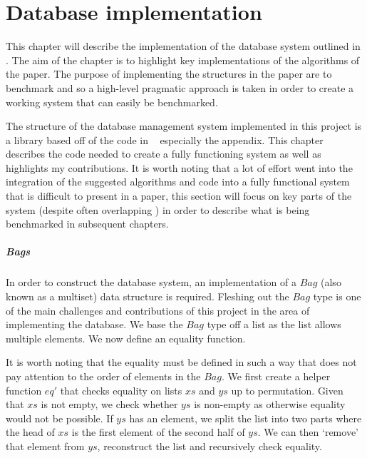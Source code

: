 \chapter{Database implementation}\label{chap:database}
This chapter will describe the implementation of the database system outlined in
\relalg{}. The aim of the chapter is to highlight key implementations of the
algorithms of the paper. The purpose of implementing the structures in the paper
are to benchmark and so a high-level pragmatic approach is taken in order to
create a working system that can easily be benchmarked. 

The structure of the database management system implemented in this
project is a library based off of the code in
\relalg{}~\cite{RelationalAlgebraByWayOfAdjunctions} especially the appendix.
This chapter describes the code needed to create a fully functioning
system as well as highlights my contributions. It is worth noting that
a lot of effort went into the integration of the suggested algorithms and code
into a fully functional system that is difficult to present in a paper, this
section will focus on key parts of the system (despite often overlapping
\relalg{}) in order to describe what is being benchmarked in subsequent
chapters.

\paragraph{Bags} In order to construct the database system, an
implementation of a $Bag$ (also known as a multiset) data structure is
required. Fleshing out the $Bag$ type is one of the main challenges and
contributions of this project in the area of implementing the database. We
base the $Bag$ type off a list as the list allows multiple elements. We now
define an equality function.



\noindent
It is worth noting that the equality must be defined in such a way that does not
pay attention to the order of elements in the $Bag$. We first create a helper
function $eq'$ that checks equality on lists $xs$ and $ys$ up to permutation.
Given that $xs$ is not empty, we check whether $ys$ is non-empty as otherwise
equality would not be possible. If $ys$ has an element, we split the list into
two parts where the head of $xs$ is the first element of the second half of
$ys$. We can then `remove' that element from $ys$, reconstruct the list and
recursively check equality.


